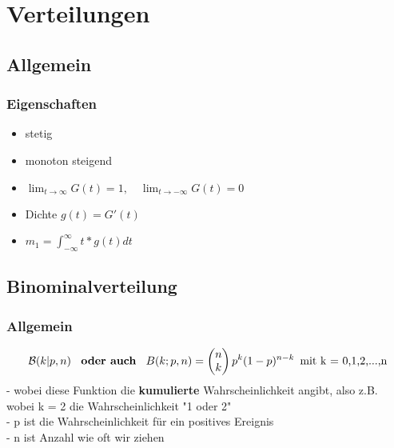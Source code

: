 \documentclass{article}
\begin{document}
	\section{Verteilungen}
	\subsection{Allgemein}
	\subsubsection{Eigenschaften}
	\begin{itemize}		
		\item stetig
		\item monoton steigend
		\item $\lim_{t \to \infty} G(t) = 1, \quad \lim_{t \to -\infty} G(t) = 0$
		\item Dichte $g(t) = G'(t)$
		\item $m_1 = \int_{-\infty}^{\infty}t*g(t)dt$
	\end{itemize}
	\subsection{Binominalverteilung}
	\subsubsection{Allgemein}
	\[
	\mathcal{B}(k | p,n) \enspace \textbf{ oder auch } \enspace B(k;p,n) =
	\begin{pmatrix} n \\ k \end{pmatrix} p^k(1-p)^{n-k} \enspace \newline
	\text{mit k = 0,1,2,...,n} \]
	- wobei diese Funktion die \textbf{kumulierte} Wahrscheinlichkeit angibt, also z.B.
	wobei k = 2 die Wahrscheinlichkeit "1 oder 2"
	\\ - p ist die Wahrscheinlichkeit für ein positives Ereignis
	\\ - n ist Anzahl wie oft wir ziehen
	
\end{document}
